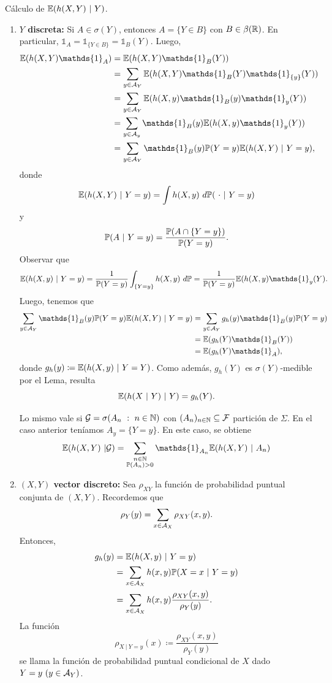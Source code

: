 Cálculo de $\mbb{E}(h(X,Y) \ | \ Y)$.
\begin{enumerate}
	\item \textbf{$Y$ discreta:} Si $A \in \sigma(Y)$, entonces $A = \{Y \in B\}$ con $B \in \beta(\mathbb{R})$. En particular, $\mathds{1}_{A} = \mathds{1}_{\{Y \in B\}} = \mathds{1}_{B}(Y)$. Luego,
	\begin{align*}
		\mbb{E}(h(X,Y) \mathds{1}_{A}) &= \mbb{E}(h(X,Y) \mathds{1}_{B}(Y)) \\
		&= \sum_{y \in \mcal{A}_{Y}} \mbb{E}(h(X,Y) \mathds{1}_{B}(Y) \mathds{1}_{\{y\}}(Y)) \\
		&= \sum_{y \in \mcal{A}_{Y}} \mbb{E}(h(X,y) \mathds{1}_{B}(y) \mathds{1}_{y}(Y)) \\
		&= \sum_{y \in \mcal{A}_{y}} \mathds{1}_{B}(y) \mbb{E}(h(X,y) \mathds{1}_{y}(Y)) \\
		&= \sum_{y \in \mcal{A}_{Y}} \mathds{1}_{B}(y) \mbb{P}(Y = y) \mbb{E}(h(X,Y) \ | \ Y = y)
	,\end{align*}
	donde 
	\[ \mathbb{E}(h(X,Y) \ | \ Y = y) = \int h(X,y) \ d\mathbb{P}( \ \cdot \ | \ Y = y) \]
	y 
	\[ \mathbb{P}(A \ | \ Y = y) = \frac{\mathbb{P}(A \cap \{Y = y\})}{\mathbb{P}(Y = y)}. \]
	Observar que
	\[ \mbb{E}(h(X,y) \ | \ Y = y) = \frac{1}{\mbb{P}(Y = y)} \int_{\{Y = y\}} h(X,y) \ d\mbb{P} = \frac{1}{\mbb{P}(Y = y)} \mbb{E}(h(X,y) \mathds{1}_{y}(Y). \]
	Luego, tenemos que
	\begin{align*}
		\sum_{y \in \mcal{A}_{Y}} \mathds{1}_{B}(y) \mbb{P}(Y = y) \mbb{E}(h(X,Y) \ | \ Y = y) &= \sum_{y \in \mcal{A}_{Y}} g_{h}(y) \mathds{1}_{B}(y) \mbb{P}(Y = y) \\
		&= \mbb{E}(g_{h}(Y) \mathds{1}_{B}(Y)) \\
		&= \mbb{E}(g_{h}(Y) \mathds{1}_{A})
	,\end{align*}
	donde $g_{h}(y) \coloneq \mathbb{E}(h(X,y) \ | \ Y = Y)$. Como además, $g_{h}(Y)$ es $\sigma(Y)$-medible por el Lema, resulta
	\[ \mbb{E}(h(X \ | \ Y) \ | \ Y) = g_{h}(Y). \]
	\begin{note}
		Lo mismo vale si $\mcal{G} = \sigma(A_{n} \ : \ n \in \N)$ con $(A_{n})_{n \in \mathbb{N}} \subseteq \mathcal{F}$ partición de $\Sigma$. En el caso anterior teníamos $A_{y} = \{Y = y\}$. En este caso, se obtiene
		\[ \mbb{E}(h(X,Y) \ | \mcal{G}) = \sum_{\substack{n \in \N \\ \mbb{P}(A_{n}) > 0}} \mathds{1}_{A_{n}} \mbb{E}(h(X,Y) \ | \ A_{n}) \]
	\end{note}

	\item \textbf{$(X,Y)$ vector discreto:} Sea $\rho_{XY}$ la función de probabilidad puntual conjunta de $(X,Y)$. Recordemos que
	\[ \rho_{Y}(y) = \sum_{x \in \mathcal{A}_{X}} \rho_{XY}(x,y). \]
	Entonces,
	\begin{align*}
		g_{h}(y) &= \mathbb{E}(h(X,y) \ | \ Y = y) \\
		&= \sum_{x \in \mathcal{A}_{X}} h(x,y) \mathbb{P}(X = x \ | \ Y = y) \\
		&= \sum_{x \in \mathcal{A}_{X}} h(x,y) \frac{\rho_{XY}(x,y)}{\rho_{Y}(y)}
	.\end{align*}
	La función
	\[ \rho_{X \ | \ Y = y}(x) \coloneq \frac{\rho_{XY}(x,y)}{\rho_{Y}(y)} \]
	se llama la función de probabilidad puntual condicional de $X$ dado $Y = y \ (y \in \mathcal{A}_{Y})$.


\end{enumerate}
